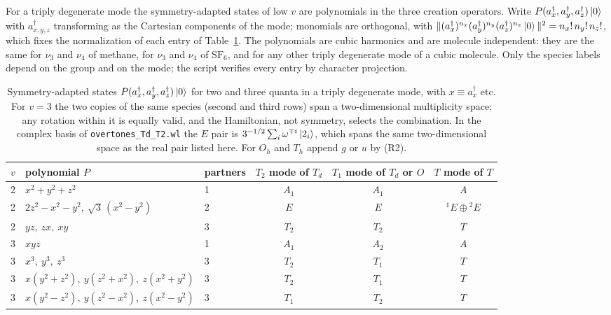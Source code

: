 \documentclass[11pt]{article}
\begin{document}
For a triply degenerate mode the symmetry-adapted states of low $v$ are polynomials in the three creation operators. Write $P(a^\dagger_x,a^\dagger_y,a^\dagger_z)\ket0$ with $a^\dagger_{x,y,z}$ transforming as the Cartesian components of the mode; monomials are orthogonal, with $\|(a^\dagger_x)^{n_x}(a^\dagger_y)^{n_y}(a^\dagger_z)^{n_z}\ket0\|^2=n_x!\,n_y!\,n_z!$, which fixes the normalization of each entry of Table~\ref{tab:cubic_states}. The polynomials are cubic harmonics and are molecule independent: they are the same for $\nu_3$ and $\nu_4$ of methane, for $\nu_3$ and $\nu_4$ of $\mathrm{SF_6}$, and for any other triply degenerate mode of a cubic molecule. Only the species labels depend on the group and on the mode; the script verifies every entry by character projection.

\begin{table}[H]
\centering\small
\begin{tabular}{cllccc}
\hline
$v$ & polynomial $P$ & partners & $T_2$ mode of $T_d$ & $T_1$ mode of $T_d$ or $O$ & $T$ mode of $T$\\
\hline
2 & $x^2+y^2+z^2$ & 1 & $A_1$ & $A_1$ & $A$\\
2 & $2z^2-x^2-y^2,\ \sqrt3\,(x^2-y^2)$ & 2 & $E$ & $E$ & ${}^1E\oplus{}^2E$\\
2 & $yz,\ zx,\ xy$ & 3 & $T_2$ & $T_2$ & $T$\\
\hline
3 & $xyz$ & 1 & $A_1$ & $A_2$ & $A$\\
3 & $x^3,\ y^3,\ z^3$ & 3 & $T_2$ & $T_1$ & $T$\\
3 & $x(y^2+z^2),\ y(z^2+x^2),\ z(x^2+y^2)$ & 3 & $T_2$ & $T_1$ & $T$\\
3 & $x(y^2-z^2),\ y(z^2-x^2),\ z(x^2-y^2)$ & 3 & $T_1$ & $T_2$ & $T$\\
\hline
\end{tabular}
\caption{Symmetry-adapted states $P(a^\dagger_x,a^\dagger_y,a^\dagger_z)\ket0$ for two and three quanta in a triply degenerate mode, with $x\equiv a^\dagger_x$ etc. For $v=3$ the two copies of the same species (second and third rows) span a two-dimensional multiplicity space; any rotation within it is equally valid, and the Hamiltonian, not symmetry, selects the combination. In the complex basis of \texttt{overtones\_Td\_T2.wl} the $E$ pair is $3^{-1/2}\sum_i\omega^{\mp i}\ket{2_i}$, which spans the same two-dimensional space as the real pair listed here. For $O_h$ and $T_h$ append $g$ or $u$ by (R2).}
\label{tab:cubic_states}
\end{table}
\end{document}
